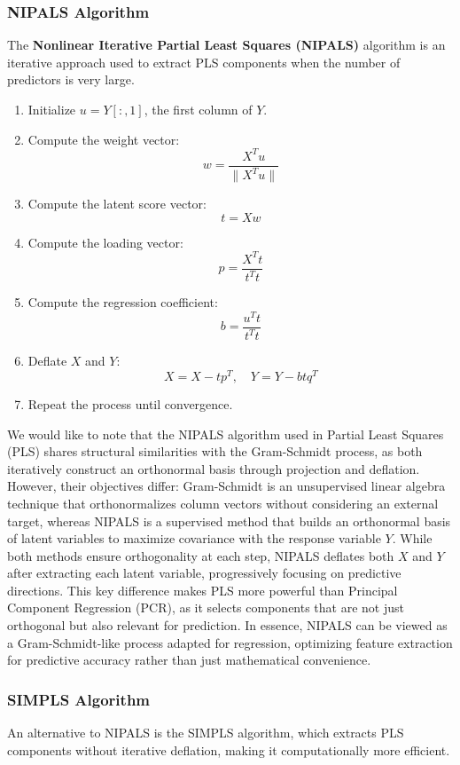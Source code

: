 \documentclass[11pt,twoside,a4paper]{article}
\begin{document}
\subsubsection{NIPALS Algorithm}
The \textbf{Nonlinear Iterative Partial Least Squares (NIPALS)} algorithm is an iterative approach used to extract PLS components when the number of predictors is very large.

\begin{enumerate}
    \item Initialize \( u = Y[:,1] \), the first column of \( Y \).
    \item Compute the weight vector:
        \[
        w = \frac{X^T u}{\|X^T u\|}
        \]
    \item Compute the latent score vector:
        \[
        t = Xw
        \]
    \item Compute the loading vector:
        \[
        p = \frac{X^T t}{t^T t}
        \]
    \item Compute the regression coefficient:
        \[
        b = \frac{u^T t}{t^T t}
        \]
    \item Deflate \( X \) and \( Y \):
        \[
        X = X - tp^T, \quad Y = Y - btq^T
        \]
    \item Repeat the process until convergence.
\end{enumerate}

We would like to note that the NIPALS algorithm used in Partial Least Squares (PLS) shares structural similarities with the Gram-Schmidt process, as both iteratively construct an orthonormal basis through projection and deflation. However, their objectives differ: Gram-Schmidt is an unsupervised linear algebra technique that orthonormalizes column vectors without considering an external target, whereas NIPALS is a supervised method that builds an orthonormal basis of latent variables to maximize covariance with the response variable \( Y \). While both methods ensure orthogonality at each step, NIPALS deflates both \( X \) and \( Y \) after extracting each latent variable, progressively focusing on predictive directions. This key difference makes PLS more powerful than Principal Component Regression (PCR), as it selects components that are not just orthogonal but also relevant for prediction. In essence, NIPALS can be viewed as a Gram-Schmidt-like process adapted for regression, optimizing feature extraction for predictive accuracy rather than just mathematical convenience.

\subsubsection{SIMPLS Algorithm}
An alternative to NIPALS is the SIMPLS algorithm, which extracts PLS components without iterative deflation, making it computationally more efficient.
\end{document}
